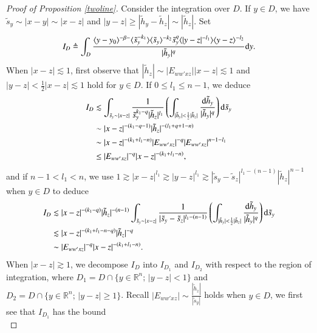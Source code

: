 \documentclass[11pt,reqno]{amsart}
\def\d{{\rm d}}
\numberwithin{equation}{section}
\theoremstyle{definition}
\begin{document}
\begin{appendix}
\begin{proof}[Proof of Proposition \ref{twoline}]
		Consider the integration over $D$. If $y\in D$, we have $\tilde{s}_y\sim|x-y|\sim|x-z|$ and $|y-z|\geq|\tilde{h}_y-\tilde{h}_z|\sim|\tilde{h}_z|$. Set
		\begin{equation}\label{ll24}
			I_D\triangleq\int_D\frac{\langle y-y_0\rangle^{-\beta-}\langle\tilde{s}_y^{-k_1}\rangle\langle\tilde{s}_y\rangle^{-k_2}\tilde{s}_y^q\langle|y-z|^{-l_1}\rangle\langle y-z\rangle^{-l_2}}{|\tilde{h}_y|^q}\d y.
		\end{equation}
		When $|x-z|\lesssim1$, first observe that $|\tilde{h}_z|\sim|E_{ww'xz}||x-z|\lesssim1$ and $|y-z|<\frac12|x-z|\lesssim1$ hold for $y\in D$. If $0\leq l_1\leq n-1$, we deduce
		\begin{equation*}\label{l24}
			\begin{split}
				I_D&\lesssim\int_{\tilde{s}_y\sim|x-z|}\frac{1}{\tilde{s}_y^{k_1-q}|\tilde{h}_z|^{l_1}}\left(\int_{|\tilde{h}_y|<\frac12|\tilde{h}_z|}\frac{\d\tilde{h}_y}{|\tilde{h}_y|^q}\right)\d\tilde{s}_y\\
				&\sim|x-z|^{-(k_1-q-1)}|\tilde{h}_z|^{-(l_1+q+1-n)}\\
				&\sim|x-z|^{-(k_1+l_1-n)}|E_{ww'xz}|^{-q}|E_{ww'xz}|^{n-1-l_1}\\
				&\leq|E_{ww'xz}|^{-q}|x-z|^{-(k_1+l_1-n)},
			\end{split}
		\end{equation*}
		and if $n-1<l_1<n$, we use $1\gtrsim|x-z|^{l_1}\gtrsim|y-z|^{l_1}\gtrsim|\tilde{s}_y-\tilde{s}_z|^{l_1-(n-1)}|\tilde{h}_z|^{n-1}$ when $y\in D$ to deduce
		\begin{equation*}\label{l25}
			\begin{split}
				I_D&\lesssim|x-z|^{-(k_1-q)}|\tilde{h}_z|^{-(n-1)}\int_{\tilde{s}_y\sim|x-z|}\frac{1}{|\tilde{s}_y-\tilde{s}_z|^{l_1-(n-1)}}\left(\int_{|\tilde{h}_y|<\frac12|\tilde{h}_z|}\frac{\d\tilde{h}_y}{|\tilde{h}_y|^q}\right)\d\tilde{s}_y\\
				&\lesssim|x-z|^{-(k_1+l_1-n-q)}|\tilde{h}_z|^{-q}\\
				&\sim|E_{ww'xz}|^{-q}|x-z|^{-(k_1+l_1-n)}.
			\end{split}
		\end{equation*}
		When $|x-z|\gtrsim1$, we decompose $I_D$ into $I_{D_1}$ and $I_{D_2}$ with respect to the region of integration, where $D_1=D\cap\{y\in\mathbb{R}^n;\,|y-z|<1\}$ and $D_2=D\cap\{y\in\mathbb{R}^n;\,|y-z|\geq1\}$. Recall $|E_{ww'xz}|\sim\frac{|\tilde{h}_z|}{|\tilde{s}_y|}$ holds when $y\in D$, we first see that $I_{D_1}$ has the bound
		\begin{equation*}

\end{equation*}
\end{proof}
\end{appendix}
\end{document}
